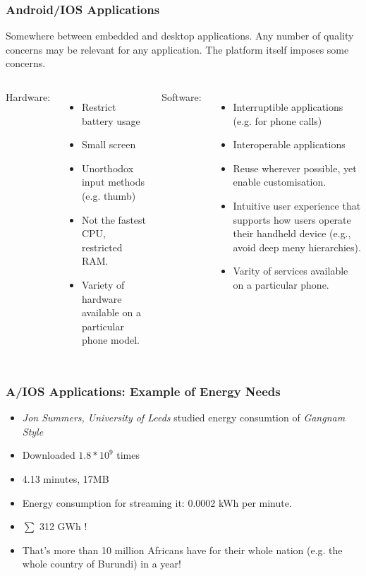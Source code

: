 \documentclass[10pt]{beamer}
\begin{document}
\begin{frame}[t]
\frametitle{Android/IOS Applications}
Somewhere between embedded and desktop applications. Any number of quality concerns may be relevant for any application. The platform itself imposes some concerns.
\vspace{0.5cm}
\begin{scriptsize}
\begin{columns}[t]
\column{5cm}
Hardware:
\begin{itemize}
\item Restrict battery usage
\item Small screen%
\item Unorthodox input methods (e.g. thumb)
\item Not the fastest CPU, restricted RAM.
\item Variety of hardware available on a particular phone model.
\end{itemize}
%
\column{5cm}
Software:
\begin{itemize}
\item Interruptible applications (e.g. for phone calls)
\item Interoperable applications
\item Reuse wherever possible, yet enable customisation.
\item Intuitive user experience that supports how users operate their handheld device (e.g., avoid deep meny hierarchies).
\item Varity of services available on a particular phone.
\end{itemize}
\end{columns}
\end{scriptsize}
\end{frame}

\begin{frame}[t]
  \frametitle{A/IOS Applications: Example of Energy Needs}
  \begin{itemize}
    \item \emph{Jon Summers, University of Leeds} studied energy consumtion of \emph{Gangnam Style}
    \item Downloaded $1.8*10^9$ times
    \item 4.13 minutes, 17MB
    \item Energy consumption for streaming it: 0.0002 kWh per minute.
    \item<2-> {\Huge $\sum$ 312 GWh !}
    \item<3-> That's more than 10 million Africans have for their whole nation (e.g. the whole country of Burundi) in a year!
  \end{itemize}
\end{frame}
\end{document}

